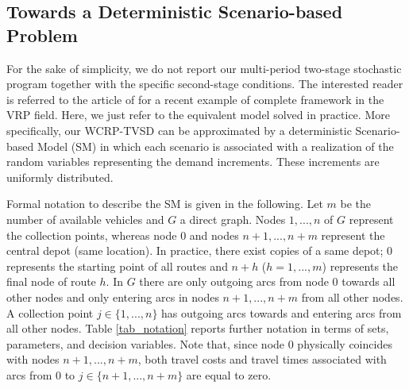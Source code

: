 \documentclass[preprint,11pt,authoryear]{elsarticle}
\begin{document}
\subsection{Towards a Deterministic Scenario-based Problem}
For the sake of simplicity, we do not report our multi-period two-stage stochastic program together with the specific second-stage conditions. The interested reader is referred to the article of \cite{Gobbi2026} for a recent example of complete framework in the VRP field. Here, we just refer to the equivalent model solved in practice. More specifically, our WCRP-TVSD can be approximated
by a deterministic Scenario-based
Model (SM) in which each
scenario is associated with a realization of the random variables representing the demand increments. These increments are uniformly distributed.

Formal notation to describe the SM is given in the following.
Let $m$ be the number of available vehicles and $G$ a direct graph. Nodes $1,...,n$ of $G$ represent the collection points, whereas node $0$ and nodes $n+1,...,n+m$ represent the central depot (same location). In practice, there exist copies of a same depot; $0$ represents the starting point of all routes and $n+h$ ($h=1,...,m$) represents the final node of route $h$. In $G$  there are only outgoing arcs from node 0 towards all other nodes and only entering arcs in nodes $n+1,...,n+m$ from all other nodes. A collection point $j \in \{1,...,n\}$ has outgoing arcs towards and entering arcs from all other nodes.  Table \ref{tab_notation} reports further notation in terms of sets, parameters, and decision variables. Note that, since node $0$ physically coincides with nodes $n+1,...,n+m$, both travel costs and travel times associated with arcs from 0 to $j\in \{n+1,...,n+m\}$ are equal to zero. 
 
\end{document}
